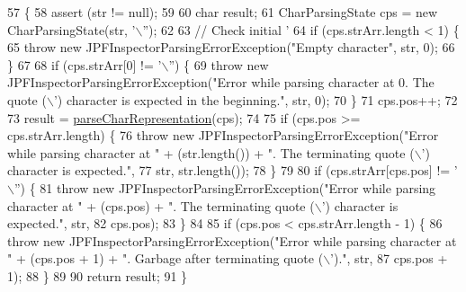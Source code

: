 \begin{DoxyCode}
57                                                                                          \{
58     assert (str != null);
59 
60     \textcolor{keywordtype}{char} result;
61     CharParsingState cps = \textcolor{keyword}{new} CharParsingState(str, \textcolor{charliteral}{'\(\backslash\)''});
62 
63     \textcolor{comment}{// Check initial '}
64     \textcolor{keywordflow}{if} (cps.strArr.length < 1) \{
65       \textcolor{keywordflow}{throw} \textcolor{keyword}{new} JPFInspectorParsingErrorException(\textcolor{stringliteral}{"Empty character"}, str, 0);
66     \}
67 
68     \textcolor{keywordflow}{if} (cps.strArr[0] != \textcolor{charliteral}{'\(\backslash\)''}) \{
69       \textcolor{keywordflow}{throw} \textcolor{keyword}{new} JPFInspectorParsingErrorException(\textcolor{stringliteral}{"Error while parsing character at 0. The quote (\(\backslash\)')
       character is expected in the beginning."}, str, 0);
70     \}
71     cps.pos++;
72 
73     result = \hyperlink{classgov_1_1nasa_1_1jpf_1_1inspector_1_1server_1_1expression_1_1expressions_1_1_expression_state_value_const_char_a077c2e90a8ff79fba830fdb02af02c4f}{parseCharRepresentation}(cps);
74 
75     \textcolor{keywordflow}{if} (cps.pos >= cps.strArr.length) \{
76       \textcolor{keywordflow}{throw} \textcolor{keyword}{new} JPFInspectorParsingErrorException(\textcolor{stringliteral}{"Error while parsing character at "} + (str.length()) + \textcolor{stringliteral}{".
       The terminating quote (\(\backslash\)') character is expected."},
77           str, str.length());
78     \}
79 
80     \textcolor{keywordflow}{if} (cps.strArr[cps.pos] != \textcolor{charliteral}{'\(\backslash\)''}) \{
81       \textcolor{keywordflow}{throw} \textcolor{keyword}{new} JPFInspectorParsingErrorException(\textcolor{stringliteral}{"Error while parsing character at "} + (cps.pos) + \textcolor{stringliteral}{". The
       terminating quote (\(\backslash\)') character is expected."}, str,
82           cps.pos);
83     \}
84 
85     \textcolor{keywordflow}{if} (cps.pos < cps.strArr.length - 1) \{
86       \textcolor{keywordflow}{throw} \textcolor{keyword}{new} JPFInspectorParsingErrorException(\textcolor{stringliteral}{"Error while parsing character at "} + (cps.pos + 1) + \textcolor{stringliteral}{".
       Garbage after terminating quote (\(\backslash\)')."}, str,
87           cps.pos + 1);
88     \}
89 
90     \textcolor{keywordflow}{return} result;
91   \}
\end{DoxyCode}
